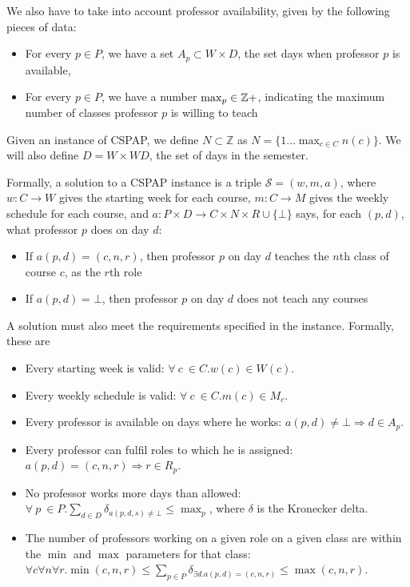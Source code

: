 We also have to take into account professor availability, given by the following pieces of data:
\begin{itemize}
\item For every $p \in P$, we have a set $A_p \subset W \times D$, the set days when professor $p$ is available,
\item For every $p \in P$, we have a number $\max_p \in \mathbb{Z}+$, indicating the maximum number of classes professor $p$ is willing to teach
\end{itemize}

Given an instance of CSPAP, we define $N \subset \mathbb{Z}$ as $N = \{1 \dots \max_{c \in C} n(c)\}$. We will also define $D = W \times WD$, the set of days in the semester.

Formally, a solution to a CSPAP instance is a triple $\mathcal{S} = (w, m, a)$, where $w: C \to W$ gives the starting week for each course, $m: C \to M$ gives the weekly schedule for each course, and $a: P \times D \to C \times N \times R \cup \{\bot\}$ says, for each $(p, d)$, what professor $p$ does on day $d$:
\begin{itemize}
\item If $a(p, d) = (c, n, r)$, then professor $p$ on day $d$ teaches the $n$th class of course $c$, as the $r$th role
\item If $a(p, d) = \bot$, then professor $p$ on day $d$ does not teach any courses
\end{itemize}

A solution must also meet the requirements specified in the instance. Formally, these are

\begin{itemize}
\item Every starting week is valid: $\forall\ c\ \in C. w(c) \in W(c)$.
\item Every weekly schedule is valid: $\forall\ c\ \in C. m(c) \in M_c$.
\item Every professor is available on days where he works: $a(p, d) \ne \bot \Rightarrow d \in A_p$.
\item Every professor can fulfil roles to which he is assigned: $a(p, d) = (c, n, r) \Rightarrow r \in R_p$.
\item No professor works more days than allowed: $\forall\ p\ \in P. \sum_{d \in D} \delta_{a(p, d, s) \ne \bot} \le \max_p$, where $\delta$ is the Kronecker delta.
\item The number of professors working on a given role on a given class are within the $\min$ and $\max$ parameters for that class: $\forall c \forall n \forall r. \min(c, n, r) \le \sum_{p \in P} \delta_{\exists d. a(p, d) = (c, n, r)} \le \max(c, n, r)$.
\end{itemize}

